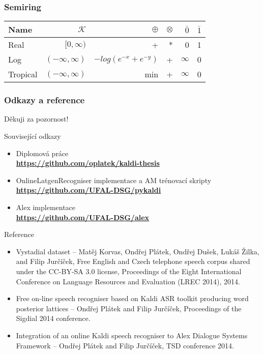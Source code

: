 \begin{frame} \frametitle{Semiring}
\begin{tabular}{lrrrrr}
\hline
Name & $\mathcal{K}$ & $\oplus$ & $ \otimes$ & $\bar{0}$ & $\bar{1}$ \\ 
\hline
Real        & $[0,\infty)$        &  +                     &  * &  0        &  1  \\
Log         & $(-\infty, \infty)$ & $-log(e^{-x} + e^{-y})$ & + &  $\infty$ &  0  \\
Tropical    & $(-\infty, \infty)$ &  min                   &  + &  $\infty$ &  0  \\
\hline
\end{tabular}
\end{frame}

\begin{frame}\frametitle{Odkazy a reference}
    Děkuji za pozornost! \\
    \begin{exampleblock}{Související odkazy}
        \begin{itemize}
            \item Diplomová práce \\ {\bf \url{https://github.com/oplatek/kaldi-thesis}}
            \item OnlineLatgenRecogniser implementace a AM trénovací skripty \\ {\bf \url{https://github.com/UFAL-DSG/pykaldi}} 
            \item Alex implementace \\ {\bf \url{https://github.com/UFAL-DSG/alex}} 
        \end{itemize}
    \end{exampleblock}
    \begin{exampleblock}{Reference}
        \tiny
        \begin{itemize}
            \item Vystadial dataset --  Matěj Korvas, Ondřej Plátek, Ondřej Dušek, Lukáš Žilka, and Filip Jurčíček, Free English and Czech telephone speech corpus shared under the CC-BY-SA 3.0 license, Proceedings of the Eight International Conference on Language Resources and Evaluation (LREC 2014), 2014.
            \item Free on-line speech recogniser based on Kaldi ASR toolkit producing word posterior lattices -- Ondřej Plátek and Filip Jurčíček, Proceedings of the Sigdial 2014 conference.
            \item Integration of an online Kaldi speech recogniser to Alex Dialogue Systems Framework -- Ondřej Plátek and Filip Jurčíček, TSD conference 2014.
        \end{itemize}
    \end{exampleblock}
\end{frame}

